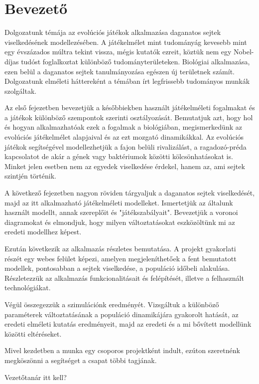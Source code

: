\chapter{Bevezető}

Dolgozatunk témája az evolúciós játékok alkalmazása daganatos sejtek viselkedésének modellezésében. A játékelmélet mint tudományág kevesebb mint egy évszázados múltra tekint vissza, mégis kutatók ezreit, köztük nem egy Nobel-díjas tudóst foglalkoztat különböző tudományterületeken. Biológiai alkalmazása, ezen belül a daganatos sejtek tanulmányozása egészen új területnek számít. Dolgozatunk elméleti háttereként a témában írt legfrissebb tudományos munkák szolgáltak.

Az első fejezetben bevezetjük a későbbiekben használt játékelméleti fogalmakat és a játékok különböző szempontok szerinti osztályozását. Bemutatjuk azt, hogy hol és hogyan alkalmazhatóak ezek a fogalmak a biológiában, megismerkedünk az evolúciós játékelmélet alapjaival és az ezt mozgató dinamikákkal. Az evolúciós játékok segítségével modellezhetjük a fajon belüli rivalizálást, a ragadozó-préda kapcsolatot de akár a gének vagy baktériumok közötti kölcsönhatásokat is. Minket jelen esetben nem az egyedek viselkedése érdekel, hanem az, ami sejtek szintjén történik.

A következő fejezetben nagyon röviden tárgyaljuk a daganatos sejtek viselkedését, majd az itt alkalmazható játékelméleti modelleket. Ismertetjük az általunk használt modellt, annak szereplőit és "játékszabályait". Bevezetjük a voronoi diagramokat és elmondjuk, hogy milyen változtatásokat eszközöltünk mi az eredeti modellhez képest. 

Ezután következik az alkalmazás részletes bemutatása. A projekt gyakorlati részét egy webes felület képezi, amelyen megjeleníthetőek a fent bemutatott modellek, pontosabban a sejtek viselkedése, a populáció időbeli alakulása. Részletezzük az alkalmazás funkcionalitásait és felépítését, illetve a felhasznált technológiákat.

Végül összegezzük a szimulációnk eredményét. Vizsgáltuk a különböző paraméterek változtatásának a populáció dinamikájára gyakorolt hatását, az eredeti elméleti kutatás eredményeit, majd az eredeti és a mi bővített modellünk közötti eltéréseket.

Mivel kezdetben a munka egy csoporos projektként indult, ezúton szeretnénk megköszönni a segítséget a csapat többi tagjának. 

Vezetőtanár itt kell? 
